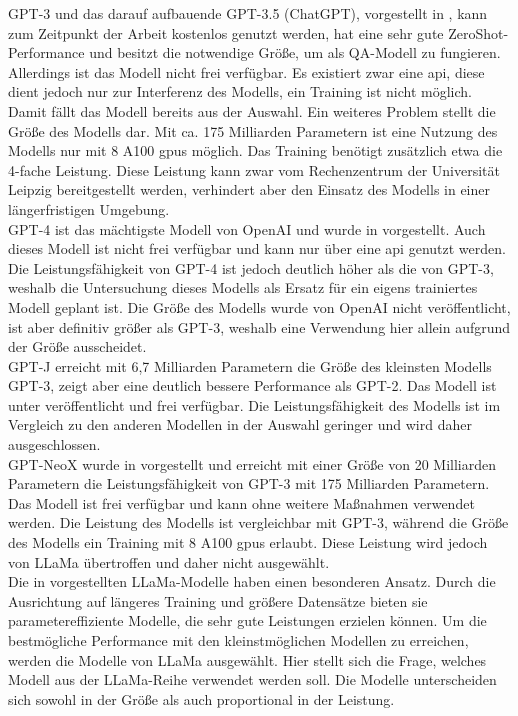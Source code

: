 GPT-3 und das darauf aufbauende GPT-3.5 (ChatGPT), vorgestellt in \citet{gpt3}, kann zum Zeitpunkt der Arbeit kostenlos genutzt werden, hat eine sehr gute ZeroShot-Performance und besitzt die notwendige Größe, um als QA-Modell zu fungieren.
Allerdings ist das Modell nicht frei verfügbar.
Es existiert zwar eine \ac{api}, diese dient jedoch nur zur Interferenz des Modells, ein Training ist nicht möglich.
Damit fällt das Modell bereits aus der Auswahl.
Ein weiteres Problem stellt die Größe des Modells dar.
Mit ca.
175 Milliarden Parametern ist eine Nutzung des Modells nur mit 8 A100 \ac{gpu}s möglich.
Das Training benötigt zusätzlich etwa die 4-fache Leistung.
Diese Leistung kann zwar vom Rechenzentrum der Universität Leipzig bereitgestellt werden, verhindert aber den Einsatz des Modells in einer längerfristigen Umgebung.\\

GPT-4 ist das mächtigste Modell von OpenAI und wurde in \citet{gpt4} vorgestellt.
Auch dieses Modell ist nicht frei verfügbar und kann nur über eine \ac{api} genutzt werden.
Die Leistungsfähigkeit von GPT-4 ist jedoch deutlich höher als die von GPT-3, weshalb die Untersuchung dieses Modells als Ersatz für ein eigens trainiertes Modell geplant ist.
Die Größe des Modells wurde von OpenAI nicht veröffentlicht, ist aber definitiv größer als GPT-3, weshalb eine Verwendung hier allein aufgrund der Größe ausscheidet.\\

GPT-J erreicht mit 6,7 Milliarden Parametern die Größe des kleinsten Modells GPT-3, zeigt aber eine deutlich bessere Performance als GPT-2.
Das Modell ist unter \citet{gptj} veröffentlicht und frei verfügbar.
Die Leistungsfähigkeit des Modells ist im Vergleich zu den anderen Modellen in der Auswahl geringer und wird daher ausgeschlossen.\\

GPT-NeoX wurde in \citet{gpt_neox} vorgestellt und erreicht mit einer Größe von 20 Milliarden Parametern die Leistungsfähigkeit von GPT-3 mit 175 Milliarden Parametern.
Das Modell ist frei verfügbar und kann ohne weitere Maßnahmen verwendet werden.
Die Leistung des Modells ist vergleichbar mit GPT-3, während die Größe des Modells ein Training mit 8 A100 \ac{gpu}s erlaubt.
Diese Leistung wird jedoch von LLaMa übertroffen und daher nicht ausgewählt.\\

Die in \citet{llama} vorgestellten LLaMa-Modelle haben einen besonderen Ansatz.
Durch die Ausrichtung auf längeres Training und größere Datensätze bieten sie parametereffiziente Modelle, die sehr gute Leistungen erzielen können.
Um die bestmögliche Performance mit den kleinstmöglichen Modellen zu erreichen, werden die Modelle von LLaMa ausgewählt.
Hier stellt sich die Frage, welches Modell aus der LLaMa-Reihe verwendet werden soll.
Die Modelle unterscheiden sich sowohl in der Größe als auch proportional in der Leistung.\\

